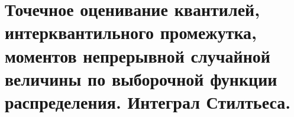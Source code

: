 \documentclass[polytech/stats/exam-2023/stats-exam-2023.tex]{subfiles}
\begin{document}
\section{Точечное оценивание квантилей, интерквантильного промежутка, моментов непрерывной случайной величины по выборочной функции распределения. Интеграл Стилтьеса.}
\end{document}
